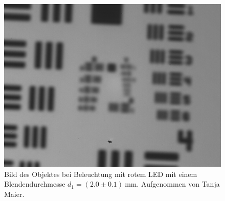 \documentclass{article}
\begin{document}
\begin{minipage}[t]{.45\textwidth}
\begin{figure}[H]
\includegraphics[scale=0.1]{tm/Bild_rot_kleine Lochblende.jpg}
\caption{Bild des Objektes bei Beleuchtung mit rotem LED mit einem Blendendurchmesse $d_1=(2.0\pm0.1)~$mm. Aufgenommen von Tanja Maier.}
\end{figure}
\end{minipage}
\end{document}
